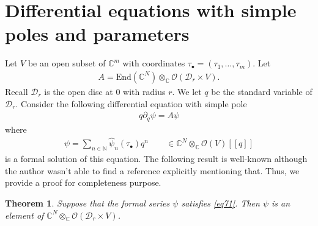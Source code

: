 \documentclass[12pt,a4paper,notitlepage]{article}
\theoremstyle{definition}
\theoremstyle{plain}
\newtheorem{thm}[df]{Theorem}
\newcommand{\mc}{\mathcal}
\newcommand{\wht}{\widehat}
\newcommand{\End}{\mathrm{End}} %
\newcommand{\scr}{\mathscr}
\newcommand{\blt}{\bullet}
\newcommand{\Cbb}{\mathbb C}
\newcommand{\Nbb}{\mathbb N}
\numberwithin{equation}{section}
\begin{document}
\appendix





\section{Differential equations with simple poles and parameters}





Let $V$ be an open subset of $\Cbb^m$ with coordinates $\tau_\blt=(\tau_1,\dots,\tau_m)$. Let
\begin{align*}
A=\End(\Cbb^N)\otimes_\Cbb\scr O(\mc D_r\times V).
\end{align*}
Recall $\mc D_r$ is the open disc at $0$ with radius $r$. We let $q$ be the standard variable of $\mc D_r$. Consider the following  differential equation with simple pole
\begin{align}
q\partial_q\psi=A\psi\label{eq71}
\end{align}
where
\begin{align}
\psi=\sum_{n\in\Nbb}\wht\psi_n(\tau_\blt)q^n\qquad \in\Cbb^N\otimes_\Cbb\scr O(V)[[q]]  \label{eq77}
\end{align}
is a formal solution of this equation. The following result is well-known although the author wasn't able to find a reference explicitly mentioning that. Thus, we provide a proof for completeness purpose.

\begin{thm}\label{lb39}
	Suppose that the formal series $\psi$ satisfies \eqref{eq71}. Then $\psi$ is an element of $\Cbb^N\otimes_\Cbb\scr O(\mc D_r\times V)$.
\end{thm}
\end{document}
